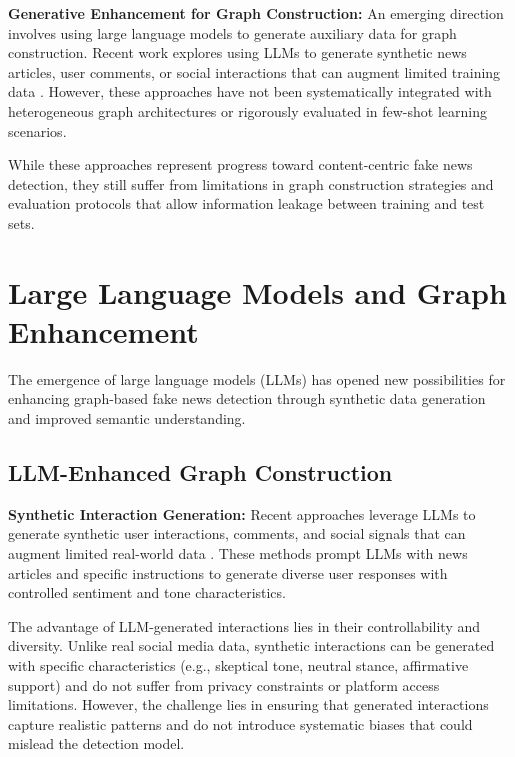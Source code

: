
\textbf{Generative Enhancement for Graph Construction:} An emerging direction involves using large language models to generate auxiliary data for graph construction. Recent work explores using LLMs to generate synthetic news articles, user comments, or social interactions that can augment limited training data \cite{yang2023let, zhang2023enhancing}. However, these approaches have not been systematically integrated with heterogeneous graph architectures or rigorously evaluated in few-shot learning scenarios.

While these approaches represent progress toward content-centric fake news detection, they still suffer from limitations in graph construction strategies and evaluation protocols that allow information leakage between training and test sets.

\section{Large Language Models and Graph Enhancement}

The emergence of large language models (LLMs) has opened new possibilities for enhancing graph-based fake news detection through synthetic data generation and improved semantic understanding.

\subsection{LLM-Enhanced Graph Construction}

\textbf{Synthetic Interaction Generation:} Recent approaches leverage LLMs to generate synthetic user interactions, comments, and social signals that can augment limited real-world data \cite{yang2023let, zhang2023on}. These methods prompt LLMs with news articles and specific instructions to generate diverse user responses with controlled sentiment and tone characteristics.


The advantage of LLM-generated interactions lies in their controllability and diversity. Unlike real social media data, synthetic interactions can be generated with specific characteristics (e.g., skeptical tone, neutral stance, affirmative support) and do not suffer from privacy constraints or platform access limitations. However, the challenge lies in ensuring that generated interactions capture realistic patterns and do not introduce systematic biases that could mislead the detection model.

